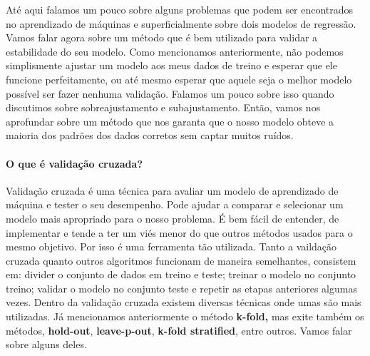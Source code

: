 \documentclass[
  letterpaper,
  DIV=11,
  numbers=noendperiod]{scrreprt}
\let\oldparagraph\paragraph
\renewcommand{\paragraph}[1]{\oldparagraph{#1}\mbox{}}
\begin{document}
Até aqui falamos um pouco sobre alguns problemas que podem ser
encontrados no aprendizado de máquinas e superficialmente sobre dois
modelos de regressão. Vamos falar agora sobre um método que é bem
utilizado para validar a estabilidade do seu modelo. Como mencionamos
anteriormente, não podemos simplismente ajustar um modelo aos meus dados
de treino e esperar que ele funcione perfeitamente, ou até mesmo esperar
que aquele seja o melhor modelo possível ser fazer nenhuma validação.
Falamos um pouco sobre isso quando discutimos sobre sobreajustamento e
subajustamento. Então, vamos nos aprofundar sobre um método que nos
garanta que o nosso modelo obteve a maioria dos padrões dos dados
corretos sem captar muitos ruídos.

\hypertarget{o-que-uxe9-validauxe7uxe3o-cruzada}{%
\paragraph{O que é validação
cruzada?}\label{o-que-uxe9-validauxe7uxe3o-cruzada}}

Validação cruzada é uma técnica para avaliar um modelo de aprendizado de
máquina e tester o seu desempenho. Pode ajudar a comparar e selecionar
um modelo mais apropriado para o nosso problema. É bem fácil de
entender, de implementar e tende a ter um viés menor do que outros
métodos usados para o mesmo objetivo. Por isso é uma ferramenta tão
utilizada. Tanto a vaildação cruzada quanto outros algoritmos funcionam
de maneira semelhantes, consistem em: divider o conjunto de dados em
treino e teste; treinar o modelo no conjunto treino; validar o modelo no
conjunto teste e repetir as etapas anteriores algumas vezes. Dentro da
validação cruzada existem diversas técnicas onde umas são mais
utilizadas. Já mencionamos anteriormente o método \textbf{k-fold,} mas
exite também os métodos, \textbf{hold-out}, \textbf{leave-p-out},
\textbf{k-fold stratified}, entre outros. Vamos falar sobre alguns
deles.
\end{document}
